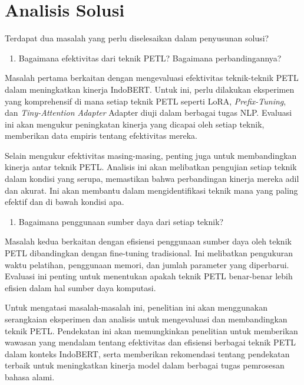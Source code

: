 \section{Analisis Solusi}

Terdapat dua masalah yang perlu diselesaikan dalam penyusunan solusi?

\begin{enumerate}
    \item Bagaimana efektivitas dari teknik PETL? Bagaimana perbandingannya?
\end{enumerate}

Masalah pertama berkaitan dengan mengevaluasi efektivitas teknik-teknik PETL dalam meningkatkan kinerja IndoBERT. Untuk ini, perlu dilakukan eksperimen yang komprehensif di mana setiap teknik PETL seperti LoRA, \textit{Prefix-Tuning}, dan \textit{Tiny-Attention Adapter} Adapter diuji dalam berbagai tugas NLP. Evaluasi ini akan mengukur peningkatan kinerja yang dicapai oleh setiap teknik, memberikan data empiris tentang efektivitas mereka.

Selain mengukur efektivitas masing-masing, penting juga untuk membandingkan kinerja antar teknik PETL. Analisis ini akan melibatkan pengujian setiap teknik dalam kondisi yang serupa, memastikan bahwa perbandingan kinerja mereka adil dan akurat. Ini akan membantu dalam mengidentifikasi teknik mana yang paling efektif dan di bawah kondisi apa.

\begin{enumerate}
    \item Bagaimana penggunaan sumber daya dari setiap teknik?
\end{enumerate}

Masalah kedua berkaitan dengan efisiensi penggunaan sumber daya oleh teknik PETL dibandingkan dengan fine-tuning tradisional. Ini melibatkan pengukuran waktu pelatihan, penggunaan memori, dan jumlah parameter yang diperbarui. Evaluasi ini penting untuk menentukan apakah teknik PETL benar-benar lebih efisien dalam hal sumber daya komputasi.

Untuk mengatasi masalah-masalah ini, penelitian ini akan menggunakan serangkaian eksperimen dan analisis untuk mengevaluasi dan membandingkan teknik PETL. Pendekatan ini akan memungkinkan penelitian untuk memberikan wawasan yang mendalam tentang efektivitas dan efisiensi berbagai teknik PETL dalam konteks IndoBERT, serta memberikan rekomendasi tentang pendekatan terbaik untuk meningkatkan kinerja model dalam berbagai tugas pemrosesan bahasa alami.
